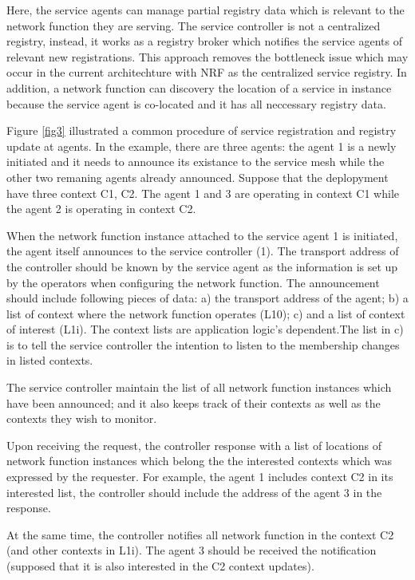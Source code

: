 \documentclass[a4paper]{article}
\begin{document}
Here, the service agents can manage partial registry data which is relevant to the network function they are serving. The service controller is not a centralized registry, instead, it works as a registry broker which notifies the service agents of relevant new registrations. This approach removes the bottleneck issue which may occur in the current architechture with NRF as the centralized service registry. In addition, a network function can discovery the location of a service in instance because the service agent is co-located and it has all neccessary registry data.

Figure \ref{fig3} illustrated a common procedure of service registration and registry update at agents. In the example, there are three agents: the agent 1 is a newly initiated and it needs to announce its existance to the service mesh while the other two remaning agents already announced. Suppose that the deplopyment have three context C1, C2. The agent 1 and 3 are operating in context C1 while the agent 2 is operating in context C2.

When the network function instance attached to the service agent 1 is initiated, the agent itself announces to the service controller (1). The transport address of the controller should be known by the service agent as the information is set up by the operators when configuring the network function.  The announcement should include following pieces of data: a) the transport address of the agent; b) a list of context where the network function operates (L10); c) and a list of context of interest (L1i). The context lists are application logic's dependent.The list in c) is to tell the service controller the intention to listen to the membership changes in listed contexts. 

The service controller maintain the list of all network function instances which have been announced; and it also keeps track of their contexts as well as the contexts they wish to monitor.

Upon receiving the request, the controller response with a list of locations of network function instances which belong the the interested contexts which was expressed by the requester. For example, the agent 1 includes context C2 in its interested list, the controller should include the address of the agent 3 in the response.

At the same time, the controller notifies all network function in the context C2 (and other contexts in L1i). The agent 3 should be received the notification (supposed that it is also interested in the C2 context updates).
\end{document}
